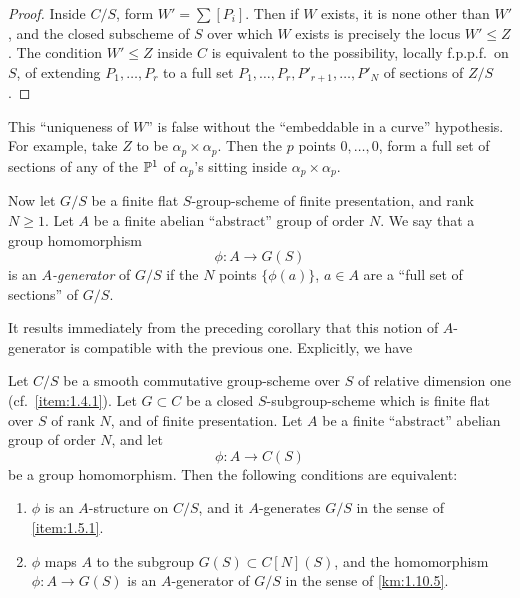 \begin{proof}
Inside $C/S$, form $W' = \sum [P_i]$. Then if $W$ exists, it is none other than $W'$, and the closed subscheme of $S$ over which $W$ exists is precisely the locus $W' \le Z$. The condition $W' \le Z$ inside $C$ is equivalent to the possibility, locally f.p.p.f.\ on $S$, of extending $P_1, \dots, P_r$ to a full set $P_1, \dots, P_r, P'_{r+1}, \dots, P'_N$ of sections of $Z/S$.
\end{proof}

\begin{remark}\label{rem:1.10.4}
This ``uniqueness of $W$'' is false without the ``embeddable in a curve'' hypothesis. For example, take $Z$ to be $\alpha_p \times \alpha_p$. Then the $p$ points $0, \dots, 0$, form a full set of sections of any of the $\mathbb{P}^1$ of $\alpha_p$'s sitting inside $\alpha_p \times \alpha_p$.
\end{remark}

\kmitem\label{km:1.10.5}
Now let $G/S$ be a finite flat $S$-group-scheme of finite presentation, and rank $N \ge 1$. Let $A$ be a finite abelian ``abstract'' group of order $N$. We say that a group homomorphism
\begin{equation}\label{eq:1.10.5.1}
\phi \colon A \longrightarrow G(S)
\end{equation}
is an \emph{$A$-generator} of $G/S$ if the $N$ points $\{\phi(a)\}$, $a \in A$ are a ``full set of sections'' of $G/S$.

It results immediately from the preceding corollary that this notion of $A$-generator is compatible with the previous one. Explicitly, we have

\begin{proposition}\label{prop:1.10.6}
Let $C/S$ be a smooth commutative group-scheme over $S$ of relative dimension one (cf.~\ref{item:1.4.1}). Let $G \subset C$ be a closed $S$-subgroup-scheme which is finite flat over $S$ of rank $N$, and of finite presentation. Let $A$ be a finite ``abstract'' abelian group of order $N$, and let
\[
\phi \colon A \longrightarrow C(S)
\]
be a group homomorphism. Then the following conditions are equivalent:
\begin{enumerate}[(1)]
\item $\phi$ is an $A$-structure on $C/S$, and it $A$-generates $G/S$ in the sense of \ref{item:1.5.1}.
\item $\phi$ maps $A$ to the subgroup $G(S) \subset C[N](S)$, and the homomorphism $\phi \colon A \to G(S)$ is an $A$-generator of $G/S$ in the sense of \ref{km:1.10.5}.
\end{enumerate}
\end{proposition}

